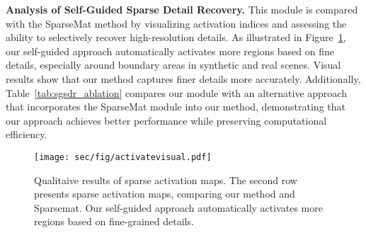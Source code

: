 \noindent
{\bf Analysis of Self-Guided Sparse Detail Recovery.} This module is compared with the SparseMat method by visualizing activation indices and assessing the ability to selectively recover high-resolution details. As illustrated in Figure~\ref{fig:activate}, our self-guided approach automatically activates more regions based on fine details, especially around boundary areas in synthetic and real scenes. Visual results show that our method captures finer details more accurately. Additionally, Table~\ref{tab:sgsdr_ablation} compares our module with an alternative approach that incorporates the SparseMat module into our method, demonstrating that our approach achieves better performance while preserving computational efficiency.

\begin{figure}[t]
    \centering
    \texttt{[image: sec/fig/activatevisual.pdf]}
    \caption {Qualitaive results of sparse activation maps. The second row presents sparse activation maps, comparing our method and Sparsemat\cite{sun2023sparsemat}. Our self-guided approach automatically activates more regions based on fine-grained details.}
    \label{fig:activate}
\end{figure}

\begin{table}[t]
    \centering
    \vspace{-0.1in}
    \caption{Comparison of Mask2Alpha with Self-Guided Sparse Detail Recovery (SGSDR) or SHM, where the baseline represents the result without detail recovery at low resolution.}
    \label{tab:sgsdr_ablation}
    \vspace{-0.1in}
\end{table}
